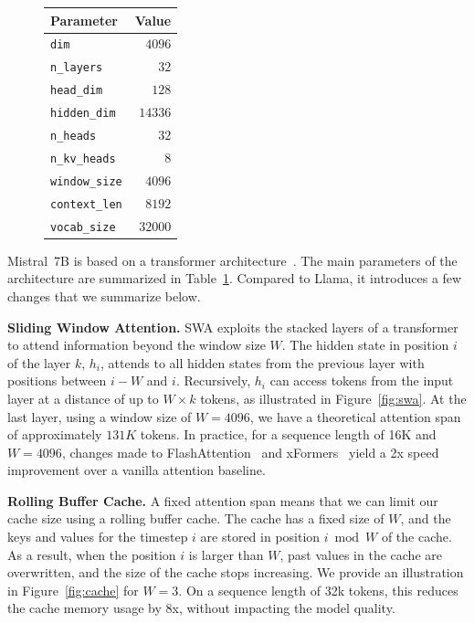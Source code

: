 \documentclass{article}
\def\llama{Llama\xspace}
\def\mistral{Mistral~7B\xspace}
\begin{document}
\begin{figure}
\center
\small
\vspace{-15pt}
\begin{tabular}{lr}
\toprule
\textbf{Parameter}  & \textbf{Value} \\ \midrule
\texttt{dim}             & $4096$           \\
\texttt{n\_layers}       & $32$             \\
\texttt{head\_dim}       & $128$            \\
\texttt{hidden\_dim}     & $14336$          \\
\texttt{n\_heads}        & $32$             \\
\texttt{n\_kv\_heads}    & $8$              \\
\texttt{window\_size}    & $4096$           \\
\texttt{context\_len}    & $8192$           \\
\texttt{vocab\_size}     & $32000$          \\ \bottomrule
\end{tabular}
\label{tab:param}
\vspace{-8pt}
\end{figure}

\mistral is based on a transformer architecture~\cite{vaswani2017attention}. The main parameters of the architecture are summarized in Table~\ref{tab:param}. Compared to \llama, it introduces a few changes that we summarize below.

 \textbf{Sliding Window Attention.} SWA exploits the stacked layers of a transformer to attend information beyond the window size $W$.
The hidden state in position $i$ of the layer $k$, $h_i$, attends to all hidden states from the previous layer with positions between $i-W$ and $i$.
Recursively, $h_i$ can access tokens from the input layer at a distance of up to $W \times k$ tokens, as illustrated in Figure~\ref{fig:swa}.
At the last layer, using a window size of $W=4096$, we have a theoretical attention span of approximately $131K$ tokens.
In practice, for a sequence length of 16K and $W=4096$, changes made to FlashAttention~\cite{dao2022flashattention} and xFormers~\cite{xFormers2022} yield a 2x speed improvement over a vanilla attention baseline.

 \textbf{Rolling Buffer Cache.} A fixed attention span means that we can limit our cache size using a rolling buffer cache.
The cache has a fixed size of $W$, and the keys and values for the timestep $i$ are stored in position $i \bmod W$ of the cache. As a result, when the position $i$ is larger than $W$, past values in the cache are overwritten, and the size of the cache stops increasing. We provide an illustration in Figure~\ref{fig:cache} for $W=3$.
On a sequence length of 32k tokens, this reduces the cache memory usage by 8x, without impacting the model quality.
\end{document}
